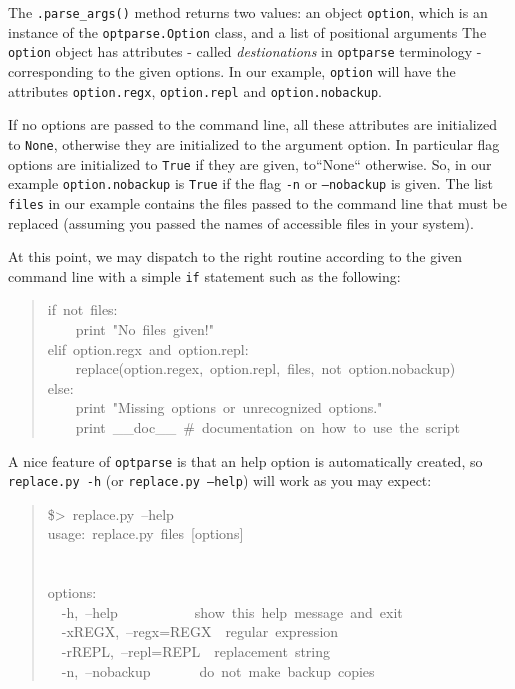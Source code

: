 \documentclass[10pt,english]{article}
\begin{document}
The \texttt{.parse{\_}args()} method returns two values: an object \texttt{option}, 
which is an instance of the \texttt{optparse.Option} class, and a list
of positional arguments
The \texttt{option} object has attributes - called \emph{destionations} in 
\texttt{optparse} terminology - corresponding to the given options.
In our example, \texttt{option} will have the attributes \texttt{option.regx}, 
\texttt{option.repl} and  \texttt{option.nobackup}.

If no options are passed to the command line, all these attributes
are initialized to \texttt{None}, otherwise they are initialized to 
the argument option. In particular flag options are initialized to 
\texttt{True} if they are given, to``None`` otherwise. So, in our example 
\texttt{option.nobackup} is \texttt{True} if the flag \texttt{-n} or \texttt{--nobackup} 
is given.
The list \texttt{files} in our example contains the files passed
to the command line that must be replaced (assuming you passed
the names of accessible files in your system).

At this point, we may dispatch to the right routine according to
the given command line with a simple \texttt{if} statement such as the
following:
\begin{quote}
\begin{ttfamily}\begin{flushleft}
\mbox{if~not~files:}\\
\mbox{~~~~print~"No~files~given!"}\\
\mbox{elif~option.regx~and~option.repl:}\\
\mbox{~~~~replace(option.regex,~option.repl,~files,~not~option.nobackup)}\\
\mbox{else:}\\
\mbox{~~~~print~"Missing~options~or~unrecognized~options."}\\
\mbox{~~~~print~{\_}{\_}doc{\_}{\_}~{\#}~documentation~on~how~to~use~the~script}
\end{flushleft}\end{ttfamily}
\end{quote}

A nice feature of \texttt{optparse} is that an help option is automatically
created, so \texttt{replace.py -h} (or  \texttt{replace.py --help}) will work as
you may expect:
\begin{quote}
\begin{ttfamily}\begin{flushleft}
\mbox{{\$}>~replace.py~--help}\\
\mbox{usage:~replace.py~files~[options]}\\
\mbox{}\\
\mbox{}\\
\mbox{options:}\\
\mbox{~~-h,~--help~~~~~~~~~~~show~this~help~message~and~exit}\\
\mbox{~~-xREGX,~--regx=REGX~~regular~expression}\\
\mbox{~~-rREPL,~--repl=REPL~~replacement~string}\\
\mbox{~~-n,~--nobackup~~~~~~~do~not~make~backup~copies}
\end{flushleft}\end{ttfamily}
\end{quote}
\end{document}

